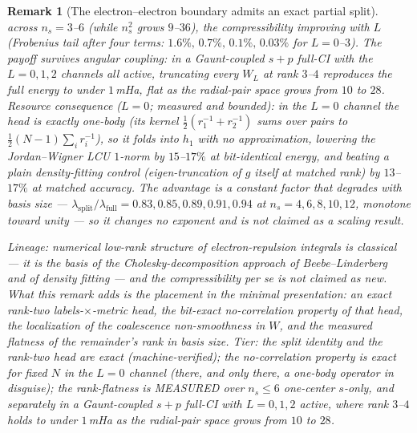 \documentclass[11pt]{article}
\newtheorem{remark}{Remark}
\begin{document}
\begin{remark}[The electron--electron boundary admits an exact partial
split]
across $n_s = 3$--$6$ (while $n_s^2$ grows $9$--$36$), the
compressibility improving with $L$ (Frobenius tail after four terms:
$1.6\%,\,0.7\%,\,0.1\%,\,0.03\%$ for $L = 0$--$3$).  The payoff
survives angular coupling: in a Gaunt-coupled $s{+}p$ full-CI with the
$L = 0,1,2$ channels all active, truncating every $W_L$ at rank $3$--$4$
reproduces the full energy to under $1$\,mHa, flat as the radial-pair
space grows from $10$ to $28$.  \emph{Resource consequence
($L=0$; measured and bounded):} in the $L=0$ channel the head is exactly
one-body (its kernel $\tfrac12(r_1^{-1}+r_2^{-1})$ sums over pairs to
$\tfrac12(N-1)\sum_i r_i^{-1}$), so it folds into $h_1$ with no
approximation, lowering the Jordan--Wigner LCU $1$-norm by
$15$--$17\%$ at bit-identical energy, and beating a plain density-fitting
control (eigen-truncation of $g$ itself at matched rank) by $13$--$17\%$ at
matched accuracy.  The advantage is a \emph{constant factor that degrades
with basis size} --- $\lambda_{\text{split}}/\lambda_{\text{full}} = 0.83,
0.85, 0.89, 0.91, 0.94$ at $n_s = 4, 6, 8, 10, 12$, monotone toward unity ---
so it changes no exponent and is not claimed as a scaling result.

\emph{Lineage:} numerical low-rank structure of electron-repulsion
integrals is classical --- it is the basis of the Cholesky-decomposition
approach of Beebe--Linderberg~\cite{beebe_linderberg1977} and of
density fitting --- and the compressibility per se is not claimed as
new.  What this remark adds is the placement in the minimal
presentation: an \emph{exact} rank-two labels-$\times$-metric head, the
bit-exact no-correlation property of that head, the localization of
the coalescence non-smoothness in $W$, and the measured flatness of
the remainder's rank in basis size.  \emph{Tier:} the split identity
and the rank-two head are exact (machine-verified); the
no-correlation property is exact for fixed $N$ in the $L=0$ channel
(there, and only there, a one-body operator in disguise); the rank-flatness is MEASURED over $n_s \le 6$ one-center $s$-only,
and separately in a Gaunt-coupled $s{+}p$ full-CI with $L = 0,1,2$
active, where rank $3$--$4$ holds to under $1$\,mHa as the radial-pair
space grows from $10$ to $28$.


\end{remark}
\end{document}
